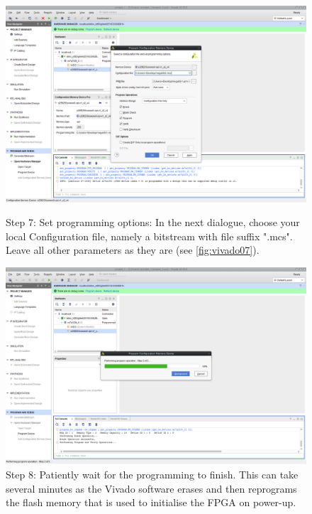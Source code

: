 \begin{figure}[H]
  \centering
  \includegraphics[width=0.85\linewidth]{images/vivado07.png}
  \captionsetup{width=0.85\linewidth}
  \caption{Step 7: Set programming options:
           In the next dialogue, choose your local Configuration file, namely
           a bitstream with file suffix ".mcs". Leave all other parameters
           as they are (see \ref{fig:vivado07}).}
  \label{fig:vivado07}

\vspace{3mm}

  \includegraphics[width=0.85\linewidth]{images/vivado08.png}
  \captionsetup{width=0.85\linewidth}
  \caption{Step 8: Patiently wait for the programming to finish.
           This can take several minutes as the Vivado software erases
           and then reprograms the flash memory that is used to
           initialise the FPGA on power-up.}
  \label{fig:vivado08}
\end{figure}


